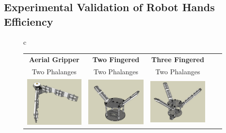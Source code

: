 \subsection{Experimental Validation of Robot Hands Efficiency}
\begin{figure}[ht!]
\begin{center}
\begin{tabular}{ c }
\begin{tabular}{ c  c  c  c  c }
	\bf{Aerial Gripper} & \bf{Two Fingered} & \bf{Three Fingered}\\
	{Two Phalanges} & {Two Phalanges} & {Two Phalanges}\\

	\includegraphics[height=2.5cm,width=3cm]{figures/Intro/Aerial_Gripper.jpg}&
	\includegraphics[height=2.5cm,width=3cm]{figures/Intro/RobotHand_2Fingered.jpg}&
	\includegraphics[height=2.5cm,width=3cm]{figures/Intro/RobotHand_3Fingered2Phalanges.jpg}\\


\end{tabular}
\end{tabular}
\end{center}
\end{figure}
